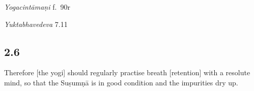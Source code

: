 \begin{ekdosis}
\begin{testimonia}[hp02_005]
\emph{Yogacintāmaṇi} f.~90r

\begin{versinnote}
\end{versinnote}

\emph{Yuktabhavedeva} 7.11
\begin{versinnote}
\end{versinnote}

\end{testimonia}

\begin{philcomm}[hp02_005]


\end{philcomm}

\subsection*{2.6}
\begin{translation}[hp02_006]
Therefore [the yogi] should regularly practise breath [retention] with a resolute mind, so that the Suṣumṇā is in good condition and the impurities dry up.%
\end{translation}


\end{ekdosis}
